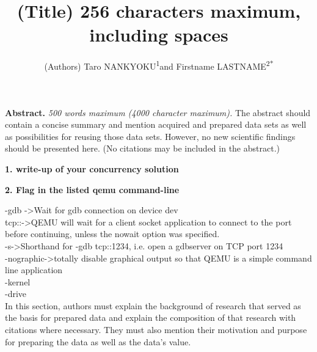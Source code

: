 \documentclass[english,10pt]{article}
\begin{document}
\title{\bf(Title) 256 characters maximum, including spaces}
\author{(Authors) Taro NANKYOKU\textsuperscript{1}and Firstname LASTNAME\textsuperscript{2{*}}}

\maketitle 

\begin{singlespace}
{\bf Abstract.} {\it500 words maximum (4000 character maximum).} The abstract should contain a concise summary and mention acquired and prepared data sets as well as possibilities for reusing those data sets. However, no new scientific findings should be presented here. (No citations may be included in the abstract.)
 
\begin{center}
{\bf 1. write-up of your concurrency solution}
\end{center}

\begin{center}
{\bf 2. Flag in the listed qemu command-line}
\end{center}
-gdb ->Wait for gdb connection on device dev\\
tcp::->QEMU will wait for a client socket application to connect to the port before continuing, unless the nowait option was specified. \\
-s->Shorthand for -gdb tcp::1234, i.e. open a gdbserver on TCP port 1234\\
-nographic->totally disable graphical output so that QEMU is a simple command line application\\
-kernel\\
-drive\\


 In this section, authors must explain the background of research that served as the basis for prepared data and explain the composition of that research with citations where necessary. They must also mention their motivation and purpose for preparing the data as well as the data’s value.
  


\end{singlespace}
\end{document}
